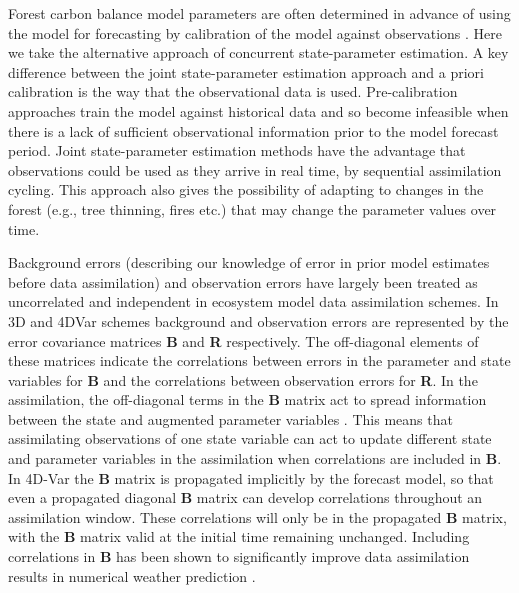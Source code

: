 Forest carbon balance model parameters are often determined in advance of using the model for forecasting by calibration of the model against observations \citep{richardson2010estimating, Bloom2015}. Here we take the alternative approach of concurrent state-parameter estimation. A key difference between the joint state-parameter estimation approach and a priori calibration is the way that the observational data is used. Pre-calibration approaches train the model against historical data and so become infeasible when there is a lack of sufficient observational information prior to the model forecast period. Joint state-parameter estimation methods have the advantage that observations could be used as they arrive in real time, by sequential assimilation cycling. This approach also gives the possibility of adapting to changes in the forest (e.g., tree thinning, fires etc.) that may change the parameter values over time. 

Background errors (describing our knowledge of error in prior model estimates before data assimilation) and observation errors have largely been treated as uncorrelated and independent in ecosystem model data assimilation schemes. In 3D and 4DVar schemes background and observation errors are represented by the error covariance matrices \textbf{B} and \textbf{R} respectively. The off-diagonal elements of these matrices indicate the correlations between errors in the parameter and state variables for \textbf{B} and the correlations between observation errors for \textbf{R}. In the assimilation, the off-diagonal terms in the \textbf{B} matrix act to spread information between the state and augmented parameter variables \citep{kalnay2003atmospheric}. This means that assimilating observations of one state variable can act to update different state and parameter variables in the assimilation when correlations are included in \textbf{B}. In 4D-Var the \textbf{B} matrix is propagated implicitly by the forecast model, so that even a propagated diagonal \textbf{B} matrix can develop correlations throughout an assimilation window. These correlations will only be in the propagated \textbf{B} matrix, with the \textbf{B} matrix valid at the initial time remaining unchanged. Including correlations in \textbf{B} has been shown to significantly improve data assimilation results in numerical weather prediction \citep{bannister2008review}. 

